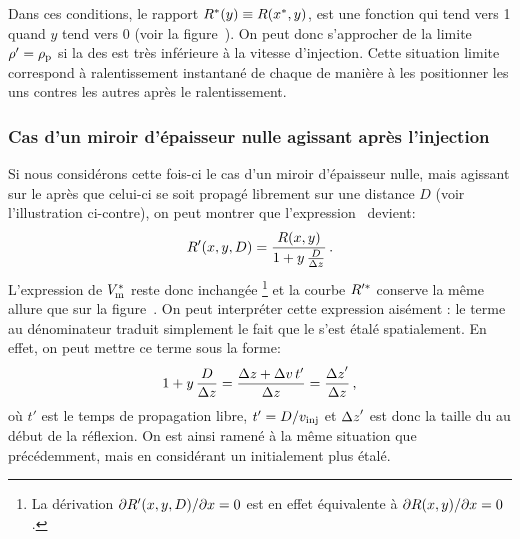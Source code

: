 Dans ces conditions, le rapport $R^\ast(y) \equiv R(x^\ast,y)$, est une fonction qui tend vers 1 quand $y$ tend vers 0 (voir la figure~). 
On peut donc s'approcher de la limite $\rho' = \rho_{\rm p}$ si la \dispvitlong des \pats est très inférieure à la vitesse d'injection. 
Cette situation limite correspond à ralentissement instantané de chaque \p de manière à les positionner les uns contres les autres après le ralentissement.


\casse

\subsubsection{Cas d'un miroir d'épaisseur nulle agissant après l'injection}
Si nous considérons cette fois-ci le cas d'un miroir d'épaisseur nulle, mais agissant sur le \p après que celui-ci se soit propagé librement sur une distance $D$ (voir l'illustration ci-contre), on peut montrer que l'expression~ devient:
\[
R'(x,y,D) = \frac{R(x,y)}{1+y\,\frac{D}{{\Delta z}}}
\, .
\]
L'expression de ${V_{\rm {m}}^\ast}$ reste donc inchangée%
\footnote{La dérivation ${{\partial R'(x,y,D)} / {\partial x}} = 0$ est en effet équivalente à  ${{\partial R(x,y)} / {\partial x}} = 0$.}
 et la courbe $R'^\ast$ conserve la même allure que sur la figure~.
On peut interpréter cette expression aisément : le terme au dénominateur traduit simplement le fait que le \p s'est étalé spatialement. 
\noindent En effet, on peut mettre ce terme sous la forme:
\[
1+y\,\dfrac{D}{{\Delta z}} = \dfrac{{\Delta z} + {\Delta v}\,t'}{{\Delta z}} = \dfrac{{\Delta z}'}{{\Delta z}}
\, ,
\]
où $t'$ est le temps de propagation libre, $t'={{D} / {v_{{\rm {inj}}}}}$ et ${\Delta z}'$ est donc la taille du \p au début de la réflexion. On est ainsi ramené à la même situation que précédemment, mais en considérant un \p initialement plus étalé.

